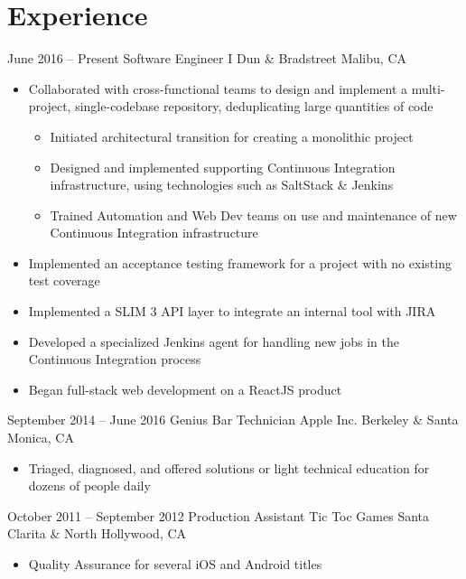 \documentclass[11pt,a4paper,sans]{moderncv}        %
\begin{document}
\makecvtitle

\section{Experience}        %

\cventry
{June 2016 -- Present}          {Software Engineer I}
{Dun \& Bradstreet}             {Malibu, CA}
{}
{
\begin{itemize}
    \item Collaborated with cross-functional teams to design and implement a multi-project, single-codebase repository, deduplicating large quantities of code
    \begin{itemize}
        \item Initiated architectural transition for creating a monolithic project
        \item Designed and implemented supporting Continuous Integration infrastructure, using technologies such as SaltStack \& Jenkins
        \item Trained Automation and Web Dev teams on use and maintenance of new Continuous Integration infrastructure
    \end{itemize}
    \item Implemented an acceptance testing framework for a project with no existing test coverage
    \item Implemented a SLIM 3 API layer to integrate an internal tool with JIRA
    \item Developed a specialized Jenkins agent for handling new jobs in the Continuous Integration process
    \item Began full-stack web development on a ReactJS product
\end{itemize}
}   %

\cventry
{September 2014 -- June 2016}	{Genius Bar Technician}
{Apple Inc.}	                {Berkeley \& Santa Monica, CA}
{}
{
\begin{itemize}
    \item Triaged, diagnosed, and offered solutions or light technical education for dozens of people daily
\end{itemize}
}   %

\cventry
{October 2011 -- September 2012}	{Production Assistant}
{Tic Toc Games}	{Santa Clarita \& North Hollywood, CA}
{}
{
\begin{itemize}
    \item Quality Assurance for several iOS and Android titles
\end{itemize}
}   %
\end{document}
